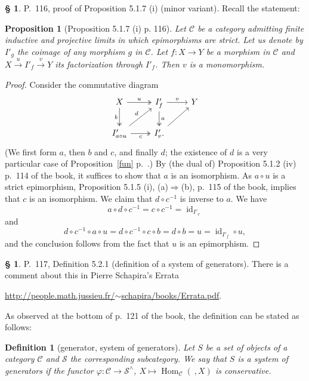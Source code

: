 \documentclass[12pt]{article}
\newtheorem{prop}[thm]{Proposition}
\newtheorem{df}[thm]{Definition}
\theoremstyle{remark}
\theoremstyle{definition}
\newtheorem{s}[thm]{\S}
\newcommand{\cc}{\mathcal}
\newcommand{\C}{\mathcal C}
\newcommand{\pp}{\varphi}
\newcommand{\then}{\Rightarrow}
\newcommand{\xr}{\xrightarrow}
\DeclareMathOperator{\id}{id}
\DeclareMathOperator{\Hom}{Hom}
\begin{document}
%

\begin{s} 
P.~116, proof of Proposition 5.1.7 (i) (minor variant). Recall the statement: 

\begin{prop}[Proposition 5.1.7 (i) p. 116]
Let $\C$ be a category admitting finite inductive and projective limits in which epimorphisms are strict. Let us denote by $I'_g$ the coimage of any morphism $g$ in $\C$. Let $f:X\to Y$ be a morphism in $\C$ and $X\xr u I'_f\xr v Y$ its factorization through $I'_f$. Then $v$ is a monomorphism. 
\end{prop}

\begin{proof}
Consider the commutative diagram
$$
\begin{tikzcd}
X\ar[two heads]{d}[swap]{b}\ar[two heads]{r}{u}&I'_f\ar[two heads]{d}{a}\ar{r}{v}&Y\\
I'_{a\circ u}\ar{ur}{d}\ar[two heads]{r}[swap]{c}&I'_v.\ar{ru}
\end{tikzcd}
$$ 
(We first form $a$, then $b$ and $c$, and finally $d$; the existence of $d$ is a very particular case of Proposition~\ref{fun} p.~\pageref{fun}.) By (the dual of) Proposition 5.1.2 (iv) p.~114 of the book, it suffices to show that $a$ is an isomorphism. As $a\circ u$ is a strict epimorphism, Proposition 5.1.5 (i), (a)$\then$(b), p.~115 of the book, implies that $c$ is an isomorphism. We claim that $d\circ c^{-1}$ is inverse to $a$. We have 
$$
a\circ d\circ c^{-1}=c\circ c^{-1}=\id_{I'_v}
$$ 
and 
$$
d\circ c^{-1}\circ a\circ u=d\circ c^{-1}\circ c\circ b=d\circ b=u=\id_{I'_f}\circ u,
$$ 
and the conclusion follows from the fact that $u$ is an epimorphism.
\end{proof}
\end{s}

%

\begin{s}
P.~117, Definition 5.2.1 (definition of a system of generators). There is a comment about this in Pierre Schapira's Errata 

\href{http://people.math.jussieu.fr/~schapira/books/Errata.pdf}{http://people.math.jussieu.fr/$\sim$schapira/books/Errata.pdf}.

As observed at the bottom of p.~121 of the book, the definition can be stated as follows:

\begin{df}[generator, system of generators] 
Let $S$ be a set of objects of a category $\C$ and $\cc S$ the corresponding subcategory. We say that $S$ is a {\em system of generators} if the functor $\pp:\C\to\cc S^\wedge$, $X\mapsto\Hom_\C(\ ,X)$ is conservative.
\end{df}
\end{s}
\end{document}
